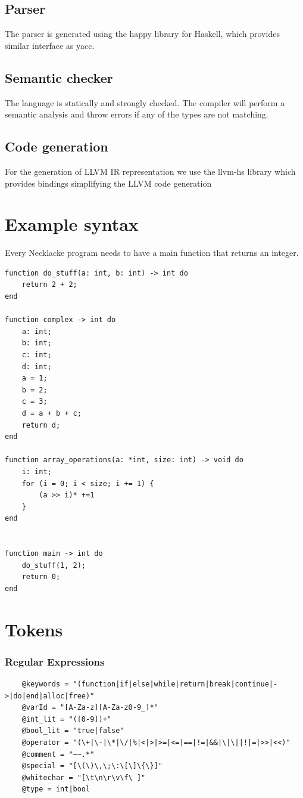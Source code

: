 \documentclass{article}
\begin{document}
\subsection{Parser}
The parser is generated using the happy library for Haskell, which provides similar interface as yacc. 


\subsection{Semantic checker}
The language is statically and strongly checked. The compiler will perform a semantic analysis and throw errors if any of the types are not matching. 



\subsection{Code generation}
For the generation of LLVM IR representation we use the llvm-hs library which provides bindings simplifying the LLVM code generation



\section{Example syntax}
Every Necklacke program needs to have a main function that returns an integer.
\begin{verbatim}
function do_stuff(a: int, b: int) -> int do
    return 2 + 2;
end

function complex -> int do
    a: int;
    b: int;
    c: int;
    d: int;
    a = 1;
    b = 2;
    c = 3;
    d = a + b + c;
    return d;
end

function array_operations(a: *int, size: int) -> void do
    i: int;
    for (i = 0; i < size; i += 1) {
        (a >> i)* +=1
    }
end


function main -> int do
    do_stuff(1, 2);
    return 0;
end
\end{verbatim}

\section{Tokens}
\subsubsection{Regular Expressions}
\begin{verbatim}
    @keywords = "(function|if|else|while|return|break|continue|->|do|end|alloc|free)"
    @varId = "[A-Za-z][A-Za-z0-9_]*"
    @int_lit = "([0-9])+" 
    @bool_lit = "true|false"
    @operator = "(\+|\-|\*|\/|%|<|>|>=|<=|==|!=|&&|\|\||!|=|>>|<<)"
    @comment = "~~.*"
    @special = "[\(\)\,\;\:\[\]\{\}]"
    @whitechar = "[\t\n\r\v\f\ ]"
    @type = int|bool
\end{verbatim}
\end{document}
